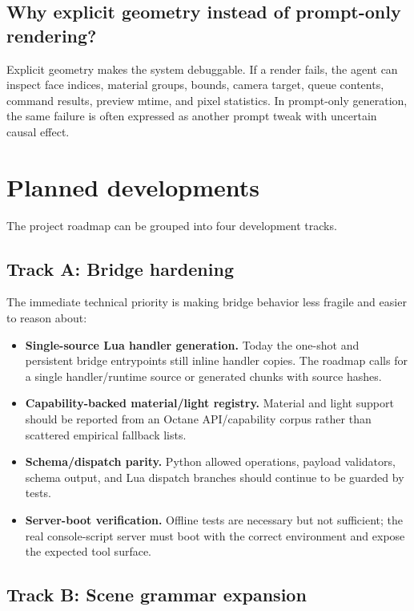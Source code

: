 \documentclass[11pt,a4paper]{article}
\begin{document}
\subsection{Why explicit geometry instead of prompt-only rendering?}

Explicit geometry makes the system debuggable. If a render fails, the agent can inspect face indices, material groups, bounds, camera target, queue contents, command results, preview mtime, and pixel statistics. In prompt-only generation, the same failure is often expressed as another prompt tweak with uncertain causal effect.

\section{Planned developments}

The project roadmap can be grouped into four development tracks.

\subsection{Track A: Bridge hardening}

The immediate technical priority is making bridge behavior less fragile and easier to reason about:

\begin{itemize}[leftmargin=*]
  \item \textbf{Single-source Lua handler generation.} Today the one-shot and persistent bridge entrypoints still inline handler copies. The roadmap calls for a single handler/runtime source or generated chunks with source hashes.
  \item \textbf{Capability-backed material/light registry.} Material and light support should be reported from an Octane API/capability corpus rather than scattered empirical fallback lists.
  \item \textbf{Schema/dispatch parity.} Python allowed operations, payload validators, schema output, and Lua dispatch branches should continue to be guarded by tests.
  \item \textbf{Server-boot verification.} Offline tests are necessary but not sufficient; the real console-script server must boot with the correct environment and expose the expected tool surface.
\end{itemize}

\subsection{Track B: Scene grammar expansion}
\end{document}
